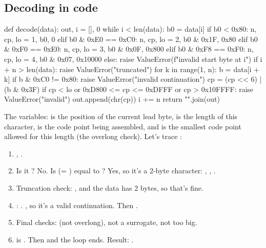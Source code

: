 \documentclass[10pt,a4paper]{article}
\begin{document}
\subsection{Decoding in code}
\begin{pycode}
def decode(data):
    out, i = [], 0
    while i < len(data):
        b0 = data[i]
        if b0 < 0x80:       n, cp, lo = 1, b0, 0
        elif b0 & 0xE0 == 0xC0: n, cp, lo = 2, b0 & 0x1F, 0x80
        elif b0 & 0xF0 == 0xE0: n, cp, lo = 3, b0 & 0x0F, 0x800
        elif b0 & 0xF8 == 0xF0: n, cp, lo = 4, b0 & 0x07, 0x10000
        else: raise ValueError(f"invalid start byte at {i}")
        if i + n > len(data): raise ValueError("truncated")
        for k in range(1, n):
            b = data[i + k]
            if b & 0xC0 != 0x80: raise ValueError("invalid continuation")
            cp = (cp << 6) | (b & 0x3F)
        if cp < lo or 0xD800 <= cp <= 0xDFFF or cp > 0x10FFFF: raise ValueError("invalid")
        out.append(chr(cp))
        i += n
    return "".join(out)
\end{pycode}
The variables:  is the position of the current lead byte,  is the length of this character,  is the code point being assembled, and  is the smallest code point allowed for this length (the overlong check). Let’s trace :
\begin{enumerate}
\item {}, .
\item Is it ? No. Is  (= ) equal to ? Yes, so it’s a 2-byte character: , , .
\item Truncation check: , and the data has 2 bytes, so that’s fine.
\item {}: . , so it’s a valid continuation. Then .
\item Final checks:  (not overlong), not a surrogate, not too big.
\item {} is . Then  and the loop ends. Result: .
\end{enumerate}
\end{document}
